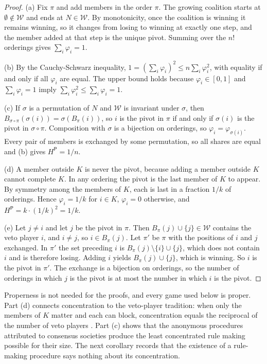 \documentclass[11pt,letterpaper]{article}
\theoremstyle{definition}
\theoremstyle{remark}
\newcommand{\pP}{\mathsf{P}}
\newcommand{\Win}{\mathcal{W}}
\begin{document}
\begin{proof}
(a) Fix $\pi$ and add members in the order $\pi$. The growing coalition starts at $\emptyset\notin\Win$ and ends at $N\in\Win$. By monotonicity, once the coalition is winning it remains winning, so it changes from losing to winning at exactly one step, and the member added at that step is the unique pivot. Summing over the $n!$ orderings gives $\sum_i\varphi_i=1$.

(b) By the Cauchy-Schwarz inequality, $1=(\sum_i\varphi_i)^2\le n\sum_i\varphi_i^2$, with equality if and only if all $\varphi_i$ are equal. The upper bound holds because $\varphi_i\in[0,1]$ and $\sum_i\varphi_i=1$ imply $\sum_i\varphi_i^2\le\sum_i\varphi_i=1$.

(c) If $\sigma$ is a permutation of $N$ and $\Win$ is invariant under $\sigma$, then $B_{\sigma\circ\pi}(\sigma(i))=\sigma(B_\pi(i))$, so $i$ is the pivot in $\pi$ if and only if $\sigma(i)$ is the pivot in $\sigma\circ\pi$. Composition with $\sigma$ is a bijection on orderings, so $\varphi_i=\varphi_{\sigma(i)}$. Every pair of members is exchanged by some permutation, so all shares are equal and (b) gives $H^{\pP}=1/n$.

(d) A member outside $K$ is never the pivot, because adding a member outside $K$ cannot complete $K$. In any ordering the pivot is the last member of $K$ to appear. By symmetry among the members of $K$, each is last in a fraction $1/k$ of orderings. Hence $\varphi_i=1/k$ for $i\in K$, $\varphi_i=0$ otherwise, and $H^{\pP}=k\cdot(1/k)^2=1/k$.

(e) Let $j\neq i$ and let $j$ be the pivot in $\pi$. Then $B_\pi(j)\cup\{j\}\in\Win$ contains the veto player $i$, and $i\neq j$, so $i\in B_\pi(j)$. Let $\pi'$ be $\pi$ with the positions of $i$ and $j$ exchanged. In $\pi'$ the set preceding $i$ is $B_\pi(j)\setminus\{i\}\cup\{j\}$, which does not contain $i$ and is therefore losing. Adding $i$ yields $B_\pi(j)\cup\{j\}$, which is winning. So $i$ is the pivot in $\pi'$. The exchange is a bijection on orderings, so the number of orderings in which $j$ is the pivot is at most the number in which $i$ is the pivot.
\end{proof}

Properness is not needed for the proofs, and every game used below is proper. Part (d) connects concentration to the veto-player tradition: when only the members of $K$ matter and each can block, concentration equals the reciprocal of the number of veto players \citep{tsebelis2002}. Part (c) shows that the anonymous procedures attributed to consensus societies produce the least concentrated rule making possible for their size. The next corollary records that the existence of a rule-making procedure says nothing about its concentration.
\end{document}

